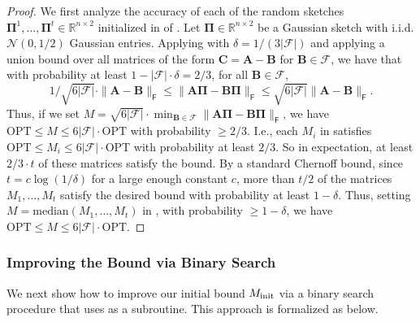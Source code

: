 \documentclass{article}[11pt]
\theoremstyle{definition}
\newcommand{\bv}[1]{\boldsymbol{\mathbf{#1}}}
\newcommand{\R}{\mathbb{R}}
\newcommand{\Fro}{\mathsf{F}}
\newcommand{\F}{\mathcal{F}}
\newcommand{\OPT}{\mathrm{OPT}}
\begin{document}
\begin{proof}
    We first analyze the accuracy of each of the random sketches $\bv{\Pi}^1,\ldots,\bv{\Pi}^t \in \R^{n \times 2}$ initialized in  of .
    Let $\bv \Pi \in \R^{n \times 2}$ be a Gaussian sketch with i.i.d. $\mathcal{N}(0,1/2)$  Gaussian entries. Applying  with $\delta = 1/(3|\F|)$ and applying a union bound over all matrices of the form $\bv C = \bv A - \bv B$ for $\bv B \in \F$, we have that with probability at least $1-|\F| \cdot \delta = 2/3$, for all $\bv B \in \F$, $$1/\sqrt{6|\F|} \cdot \|\bv A - \bv B\|_\Fro \le \|\bv A \bv \Pi - \bv B \bv \Pi\|_\Fro \le \sqrt{6|\F|} \|\bv A - \bv B\|_\Fro.$$
 Thus, if we set $M = \sqrt{6 |\F|} \cdot \min_{\bv B \in \F} \|\bv A \bv \Pi - \bv B \bv \Pi\|_\Fro$, we have $\OPT \le M \le 6|\F| \cdot \OPT$ with probability $\ge 2/3$.
I.e., each $M_i$ in  satisfies $\OPT \le M_i \le 6|\F| \cdot \OPT$ with probability at least $2/3$. So in expectation, at least $2/3 \cdot t$ of these matrices satisfy the bound. By a standard Chernoff bound, since $t = c\log(1/\delta)$ for a large enough constant $c$, more than $t/2$ of the matrices $M_1,\ldots,M_t$ satisfy the desired bound with probability at least $1-\delta$. Thus, setting $M = \mathrm{median}(M_1, \ldots, M_t)$ in , with probability $\ge 1-\delta$, we have $\OPT \le M \le 6|\F| \cdot \OPT$.
\end{proof}

\subsubsection{Improving the Bound via Binary Search}
We next show how to improve our initial bound $M_{\rm init}$ via a binary search procedure that uses  as a subroutine. This approach is formalized as  below.
\end{document}
